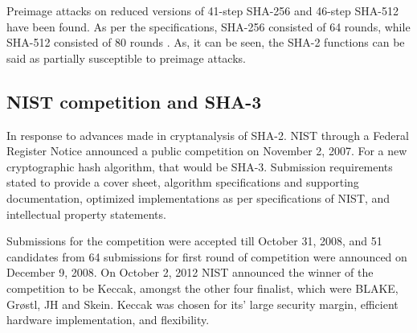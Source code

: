   Preimage attacks on reduced versions of 41-step SHA-256 and 46-step SHA-512 have been found. As per the
  specifications, SHA-256 consisted of 64 rounds, while SHA-512 consisted of 80 rounds \cite{00011}. As, it
  can be seen, the SHA-2 functions can be said as partially susceptible to preimage attacks.

  \subsection{NIST competition and SHA-3}

  In response to advances made in cryptanalysis of SHA-2. NIST through a Federal Register Notice announced 
  a public competition on November 2, 2007. For a new cryptographic hash algorithm, that would be SHA-3.
  Submission requirements stated to provide a cover sheet, algorithm specifications and supporting
  documentation, optimized implementations as per specifications of NIST, and intellectual property statements.

  Submissions for the competition were accepted till October 31, 2008, and 51 candidates from 64 submissions
  for first round of competition were announced on December 9, 2008. On October 2, 2012 NIST announced the 
  winner of the competition to be Keccak, amongst the other four finalist, which were BLAKE, Gr{\o}stl, JH
  and Skein. Keccak was chosen for its' large security margin, efficient hardware implementation, and 
  flexibility.
